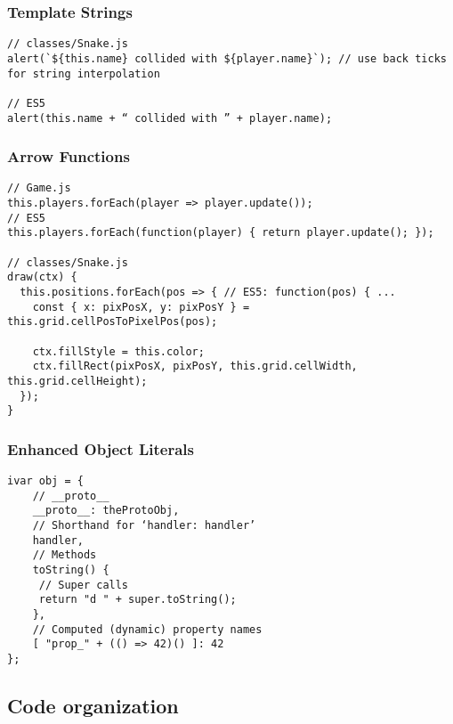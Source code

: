 \documentclass{bioinfo}
\begin{document}
\subsubsection{Template Strings}

\begin{lstlisting}[caption= My Javascript Example]
// classes/Snake.js
alert(`${this.name} collided with ${player.name}`); // use back ticks for string interpolation

// ES5
alert(this.name + “ collided with ” + player.name);
\end{lstlisting}

\subsubsection{Arrow Functions}

\begin{lstlisting}[caption= My Javascript Example]
// Game.js
this.players.forEach(player => player.update());
// ES5
this.players.forEach(function(player) { return player.update(); });

// classes/Snake.js
draw(ctx) {
  this.positions.forEach(pos => { // ES5: function(pos) { ...
    const { x: pixPosX, y: pixPosY } = this.grid.cellPosToPixelPos(pos);

    ctx.fillStyle = this.color;
    ctx.fillRect(pixPosX, pixPosY, this.grid.cellWidth, this.grid.cellHeight);
  });
}
\end{lstlisting}

\subsubsection{Enhanced Object Literals}

\begin{lstlisting}[caption= My Javascript Example]
ivar obj = {
    // __proto__
    __proto__: theProtoObj,
    // Shorthand for ‘handler: handler’
    handler,
    // Methods
    toString() {
     // Super calls
     return "d " + super.toString();
    },
    // Computed (dynamic) property names
    [ "prop_" + (() => 42)() ]: 42
};
\end{lstlisting}
\subsection{Code organization}



\end{document}
